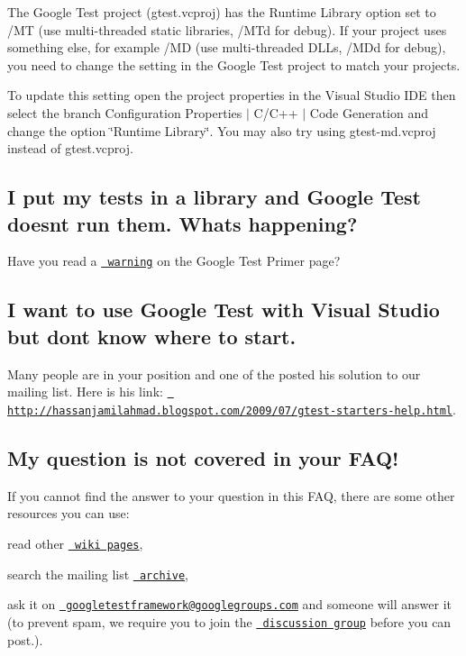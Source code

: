 The Google Test project (gtest.\+vcproj) has the Runtime Library option set to /\+MT (use multi-\/threaded static libraries, /\+M\+Td for debug). If your project uses something else, for example /\+MD (use multi-\/threaded D\+L\+Ls, /\+M\+Dd for debug), you need to change the setting in the Google Test project to match your project\textquotesingle{}s.

To update this setting open the project properties in the Visual Studio I\+DE then select the branch Configuration Properties $\vert$ C/\+C++ $\vert$ Code Generation and change the option \char`\"{}\+Runtime Library\char`\"{}. You may also try using gtest-\/md.\+vcproj instead of gtest.\+vcproj.

\subsection*{I put my tests in a library and Google Test doesn\textquotesingle{}t run them. What\textquotesingle{}s happening?}

Have you read a \href{V1_5_Primer.md#important-note-for-visual-c-users}\texttt{ warning} on the Google Test Primer page?

\subsection*{I want to use Google Test with Visual Studio but don\textquotesingle{}t know where to start.}

Many people are in your position and one of the posted his solution to our mailing list. Here is his link\+: \href{http://hassanjamilahmad.blogspot.com/2009/07/gtest-starters-help.html}\texttt{ http\+://hassanjamilahmad.\+blogspot.\+com/2009/07/gtest-\/starters-\/help.\+html}.

\subsection*{My question is not covered in your F\+A\+Q!}

If you cannot find the answer to your question in this F\+AQ, there are some other resources you can use\+:


\begin{DoxyEnumerate}
\item read other \href{http://code.google.com/p/googletest/w/list}\texttt{ wiki pages},
\end{DoxyEnumerate}
\begin{DoxyEnumerate}
\item search the mailing list \href{http://groups.google.com/group/googletestframework/topics}\texttt{ archive},
\end{DoxyEnumerate}
\begin{DoxyEnumerate}
\item ask it on \href{mailto:googletestframework@googlegroups.com}\texttt{ googletestframework@googlegroups.\+com} and someone will answer it (to prevent spam, we require you to join the \href{http://groups.google.com/group/googletestframework}\texttt{ discussion group} before you can post.).
\end{DoxyEnumerate}

